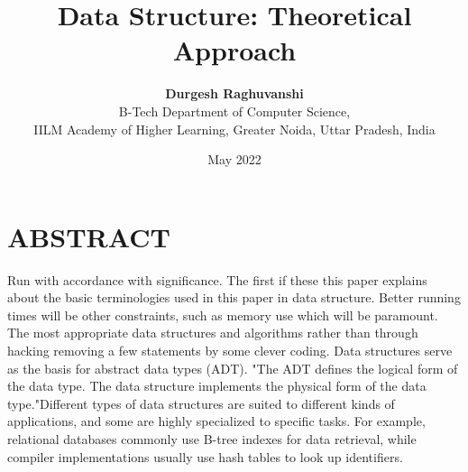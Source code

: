 \documentclass{article}
\title{\textbf{Data Structure: Theoretical Approach}}
\author{\textbf{Durgesh Raghuvanshi}\\B-Tech Department of Computer Science,\\IILM Academy of Higher Learning, Greater Noida, Uttar Pradesh, India}
\date{May 2022}
\begin{document}
\maketitle

\section*{ABSTRACT}
Run with accordance with significance. The first if
these this paper explains about the basic terminologies
used in this paper in data structure. Better running
times will be other constraints, such as memory use
which will be paramount. The most appropriate data
structures and algorithms rather than through hacking
removing a few statements by some clever coding.
Data structures serve as the basis for abstract data
types (ADT). "The ADT defines the logical form of
the data type. The data structure implements the
physical form of the data type."Different types of data
structures are suited to different kinds of applications,
and some are highly specialized to specific tasks. For
example, relational databases commonly use B-tree
indexes for data retrieval, while compiler
implementations usually use hash tables to look up
identifiers.
\end{document}
